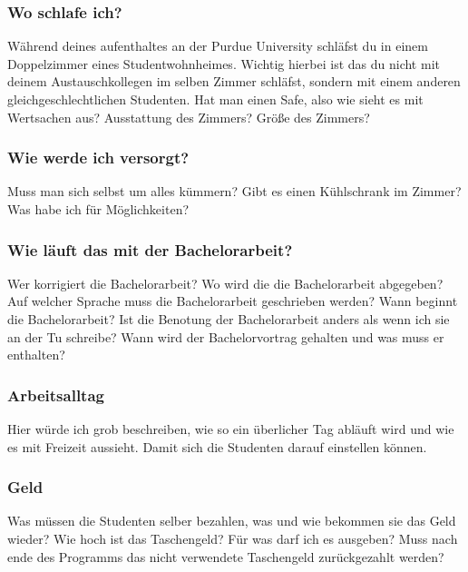\documentclass[
  paper=a4,
  fontsize=12pt,
  DIV=16,
  headheight=52pt,
  footheight=45pt,
  headinclude,
  parskip=full,
]{scrartcl}
\begin{document}
\subsubsection*{Wo schlafe ich?}
Während deines aufenthaltes an der Purdue University schläfst du in einem Doppelzimmer eines Studentwohnheimes.
Wichtig hierbei ist das du nicht mit deinem Austauschkollegen im selben Zimmer schläfst,
sondern mit einem anderen gleichgeschlechtlichen Studenten.
Hat man einen Safe, also wie sieht es mit Wertsachen aus?
Ausstattung des Zimmers?
Größe des Zimmers?

\subsubsection*{Wie werde ich versorgt?}
Muss man sich selbst um alles kümmern?
Gibt es einen Kühlschrank im Zimmer?
Was habe ich für Möglichkeiten?

\subsubsection*{Wie läuft das mit der Bachelorarbeit?}
Wer korrigiert die Bachelorarbeit?
Wo wird die die Bachelorarbeit abgegeben?
Auf welcher Sprache muss die Bachelorarbeit geschrieben werden?
Wann beginnt die Bachelorarbeit?
Ist die Benotung der Bachelorarbeit anders als wenn ich sie an der Tu schreibe?
Wann wird der Bachelorvortrag gehalten und was muss er enthalten?

\subsubsection*{Arbeitsalltag}
Hier würde ich grob beschreiben, wie so ein überlicher Tag abläuft wird und wie es mit Freizeit aussieht.
Damit sich die Studenten darauf einstellen können.

\subsubsection*{Geld}
Was müssen die Studenten selber bezahlen, was und wie bekommen sie das Geld wieder?
Wie hoch ist das Taschengeld?
Für was darf ich es ausgeben?
Muss nach ende des Programms das nicht verwendete Taschengeld zurückgezahlt werden?
\end{document}
